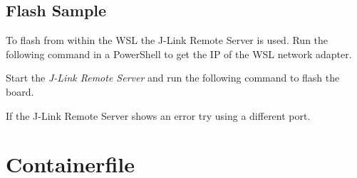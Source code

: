 \subsection{Flash Sample}

To flash from within the WSL the J-Link Remote Server is used. Run the following
command in a PowerShell to get the IP of the WSL network adapter.


Start the \emph{J-Link Remote Server} and run the following command to flash the
board.


\begin{infobox}
  If the J-Link Remote Server shows an error try using a different port.
\end{infobox}

\newpage

\fancyfoot{}

\appendix

\section{Containerfile}\label{containerfile}




